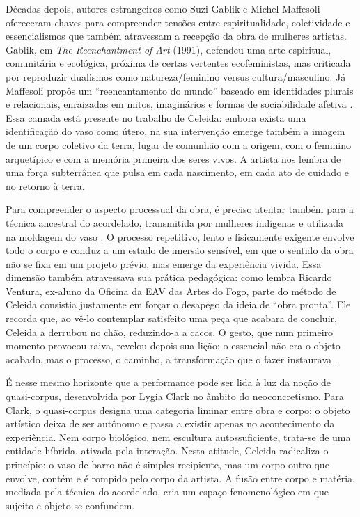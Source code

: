 Décadas depois, autores estrangeiros como Suzi Gablik e Michel Maffesoli ofereceram chaves para compreender tensões entre espiritualidade, coletividade e essencialismos que também atravessam a recepção da obra de mulheres artistas. Gablik, em \emph{The Reenchantment of Art} (1991), defendeu uma arte espiritual, comunitária e ecológica, próxima de certas vertentes ecofeministas, mas criticada por reproduzir dualismos como natureza/feminino versus cultura/masculino. Já Maffesoli propôs um “reencantamento do mundo” baseado em identidades plurais e relacionais, enraizadas em mitos, imaginários e formas de sociabilidade afetiva \parencite{trizoliTrajetoriasReginaVater2011}. Essa camada está presente no trabalho de Celeida: embora exista uma identificação do vaso como útero, na sua intervenção emerge também a imagem de um corpo coletivo da terra, lugar de comunhão com a origem, com o feminino arquetípico e com a memória primeira dos seres vivos. A artista nos lembra de uma força subterrânea que pulsa em cada nascimento, em cada ato de cuidado e no retorno à terra.

Para compreender o aspecto processual da obra, é preciso atentar também para a técnica ancestral do acordelado, transmitida por mulheres indígenas e utilizada na moldagem do vaso \parencite{dutraPalcoAoBarro2022}. O processo repetitivo, lento e fisicamente exigente envolve todo o corpo e conduz a um estado de imersão sensível, em que o sentido da obra não se fixa em um projeto prévio, mas emerge da experiência vivida. Essa dimensão também atravessava sua prática pedagógica: como lembra Ricardo Ventura, ex-aluno da Oficina da EAV das Artes do Fogo, parte do método de Celeida consistia justamente em forçar o desapego da ideia de “obra pronta”. Ele recorda que, ao vê-lo contemplar satisfeito uma peça que acabara de concluir, Celeida a derrubou no chão, reduzindo-a a cacos. O gesto, que num primeiro momento provocou raiva, revelou depois sua lição: o essencial não era o objeto acabado, mas o processo, o caminho, a transformação que o fazer instaurava \parencite[p.56]{nameLamaAoCaos2014}.

É nesse mesmo horizonte que a performance pode ser lida à luz da noção de quasi-corpus, desenvolvida por Lygia Clark no âmbito do neoconcretismo. Para Clark, o quasi-corpus designa uma categoria liminar entre obra e corpo: o objeto artístico deixa de ser autônomo e passa a existir apenas no acontecimento da experiência. Nem corpo biológico, nem escultura autossuficiente, trata-se de uma entidade híbrida, ativada pela interação. Nesta atitude, Celeida radicaliza o princípio: o vaso de barro não é simples recipiente, mas um corpo-outro que envolve, contém e é rompido pelo corpo da artista. A fusão entre corpo e matéria, mediada pela técnica do acordelado, cria um espaço fenomenológico em que sujeito e objeto se confundem.

